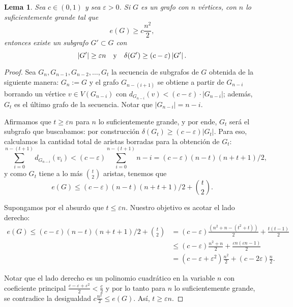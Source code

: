 \documentclass[12pt]{report}
\theoremstyle{plain}
\newtheorem{lemma}[theorem]{Lema}
\theoremstyle{definition}
\newcommand{\abs}[1]{\left \vert #1 \right \vert}
\begin{document}
\begin{lemma}\label{lema:erdos-stone lema 1}
Sea $c \in (0,1)$ y sea $\varepsilon > 0$. Si $G$ es un grafo con $n$ vértices, con $n$ lo suficientemente grande tal que
\[
    e(G) \geq c \frac{n^2}{2},
\]
entonces existe un subgrafo $G' \subset G$ con
\[
    \abs{G'} \geq \varepsilon n \quad \text y \quad \delta (G') \geq (c- \varepsilon) \abs{G'}.
\]
\end{lemma}
\begin{proof}
Sea $G_n, G_{n-1}, G_{n-2}, \ldots, G_t$ la secuencia de subgrafos de $G$ obtenida de la siguiente manera: $G_n := G$ y el grafo $G_{n - (i+1)}$ se obtiene a partir de $G_{n-i}$ borrando un vértice $v \in V(G_{n-i})$ con $d_{G_{n-i}} (v) < (c - \varepsilon) \cdot \abs{G_{n-i}}$; además, $G_t$ es el último grafo de la secuencia. Notar que $\abs{G_{n-i}} = n - i$.

Afirmamos que $t \geq \varepsilon n$ para $n$ lo suficientemente grande, y por ende, $G_t$ será el subgrafo que buscabamos: por construcción $\delta (G_t) \geq (c - \varepsilon) \abs{G_t}$. Para eso, calculamos la cantidad total de aristas borradas para la obtención de $G_t$:
\[
    \sum_{i = 0}^{n-(t+1)} d_{G_{n-i}} (v_i) < (c-\varepsilon) \sum_{i = 0}^{n-(t+1)} n-i = (c-\varepsilon) (n-t) (n+t+1)/2,
\]
y como $G_t$ tiene a lo más $\binom t 2$ aristas, tenemos que
\[
    e(G) \leq (c- \varepsilon) (n-t) (n+ t + 1)/2 + \binom t 2 .
\]

Supongamos por el absurdo que $t \leq \varepsilon n$. Nuestro objetivo es acotar el lado derecho:
\begin{align*}
e(G) \leq (c- \varepsilon) (n-t) (n+ t + 1)/2 + \binom t 2  &= (c- \varepsilon) \frac{(n^2 + n  - (t^2 + t))}{2} + \frac{t(t-1)}{2} \\
&\leq (c-\varepsilon) \frac{n^2 + n}{2 } + \frac{\varepsilon n (\varepsilon n - 1)}{2} \\
&= (c- \varepsilon + \varepsilon^2)\frac{n^2}{2} + (c - 2\varepsilon) \frac{n}{2}.
\end{align*}


Notar que el lado derecho es un polinomio cuadrático en la variable $n$ con coeficiente principal $\frac{c-\varepsilon + \varepsilon^2}{2} < \frac c 2$
y por lo tanto para $n$ lo suficientemente grande, se contradice la desigualdad $c\frac{n^2}{2} \leq e(G)$. Así, $t \geq \varepsilon n$.
\end{proof}
\end{document}
